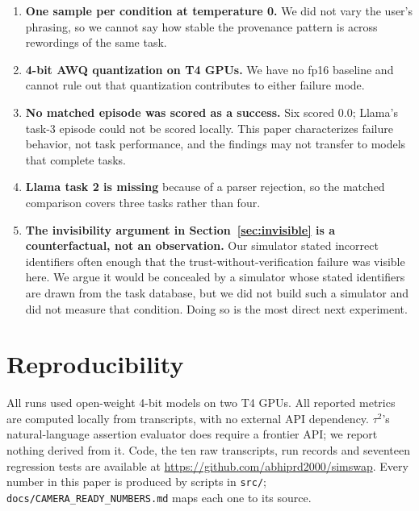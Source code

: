 \documentclass{article}
\begin{document}
\begin{enumerate}
\item \textbf{One sample per condition at temperature 0.} We did not vary the user's phrasing, so we cannot say how stable the provenance pattern is across rewordings of the same task.
\item \textbf{4-bit AWQ quantization on T4 GPUs.} We have no fp16 baseline and cannot rule out that quantization contributes to either failure mode.
\item \textbf{No matched episode was scored as a success.} Six scored $0.0$; Llama's task-3 episode could not be scored locally. This paper characterizes failure behavior, not task performance, and the findings may not transfer to models that complete tasks.
\item \textbf{Llama task 2 is missing} because of a parser rejection, so the matched comparison covers three tasks rather than four.
\item \textbf{The invisibility argument in Section~\ref{sec:invisible} is a counterfactual, not an observation.} Our simulator stated incorrect identifiers often enough that the trust-without-verification failure was visible here. We argue it would be concealed by a simulator whose stated identifiers are drawn from the task database, but we did not build such a simulator and did not measure that condition. Doing so is the most direct next experiment.
\end{enumerate}

\section{Reproducibility}

All runs used open-weight 4-bit models on two T4 GPUs. All reported metrics are computed locally from transcripts, with no external API dependency. $\tau^2$'s natural-language assertion evaluator does require a frontier API; we report nothing derived from it. Code, the ten raw transcripts, run records and seventeen regression tests are available at \url{https://github.com/abhiprd2000/simswap}. Every number in this paper is produced by scripts in \texttt{src/}; \texttt{docs/CAMERA\_READY\_NUMBERS.md} maps each one to its source.
\end{document}

